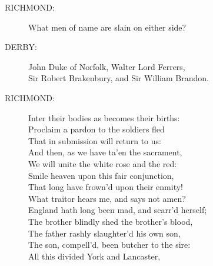 \documentclass{article}
\begin{document}
\begin{description}
\item[RICHMOND:] 
\hspace{1pt}What men of name are slain on either side?\\
\end{description}
\begin{description}
\item[DERBY:] 
\hspace{1pt}John Duke of Norfolk, Walter Lord Ferrers,\\
\hspace{1pt}Sir Robert Brakenbury, and Sir William Brandon.\\
\end{description}
\begin{description}
\item[RICHMOND:] 
\hspace{1pt}Inter their bodies as becomes their births:\\
\hspace{1pt}Proclaim a pardon to the soldiers fled\\
\hspace{1pt}That in submission will return to us:\\
\hspace{1pt}And then, as we have ta'en the sacrament,\\
\hspace{1pt}We will unite the white rose and the red:\\
\hspace{1pt}Smile heaven upon this fair conjunction,\\
\hspace{1pt}That long have frown'd upon their enmity!\\
\hspace{1pt}What traitor hears me, and says not amen?\\
\hspace{1pt}England hath long been mad, and scarr'd herself;\\
\hspace{1pt}The brother blindly shed the brother's blood,\\
\hspace{1pt}The father rashly slaughter'd his own son,\\
\hspace{1pt}The son, compell'd, been butcher to the sire:\\
\hspace{1pt}All this divided York and Lancaster,\\

\end{description}
\end{document}
